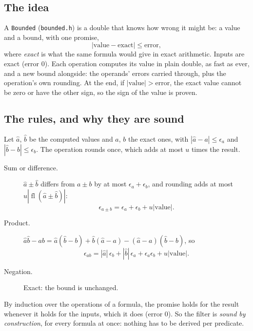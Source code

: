 \documentclass[11pt,a4paper]{article}
\newcommand{\code}[1]{\texttt{#1}}
\newcommand{\fl}{\operatorname{fl}}
\theoremstyle{definition}
\theoremstyle{remark}
\begin{document}
\subsection{The idea}

A \code{Bounded} (\code{bounded.h}) is a double that knows how wrong it might be: a value and a
bound, with one promise,
\[
  |\text{value} - \text{exact}| \le \text{error},
\]
where \emph{exact} is what the same formula would give in exact arithmetic. Inputs are exact
(error 0). Each operation computes its value in plain double, as fast as ever, and a new bound
alongside: the operands' errors carried through, plus the operation's own rounding. At the end, if
$|\text{value}| > \text{error}$, the exact value cannot be zero or have the other sign, so the sign
of the value is proven.

\subsection{The rules, and why they are sound}

Let $\hat a$, $\hat b$ be the computed values and $a$, $b$ the exact ones, with
$|\hat a - a| \le \epsilon_a$ and $|\hat b - b| \le \epsilon_b$. The operation rounds once, which
adds at most $u$ times the result.

\begin{description}
  \item[Sum or difference.] $\hat a \pm \hat b$ differs from $a \pm b$ by at most
    $\epsilon_a + \epsilon_b$, and rounding adds at most $u|\fl(\hat a \pm \hat b)|$:
    \[\epsilon_{a\pm b} = \epsilon_a + \epsilon_b + u|\text{value}|.\]
  \item[Product.] $\hat a\hat b - ab = \hat a(\hat b - b) + \hat b(\hat a - a) - (\hat a - a)(\hat b - b)$,
    so
    \[\epsilon_{ab} = |\hat a|\,\epsilon_b + |\hat b|\,\epsilon_a + \epsilon_a\epsilon_b + u|\text{value}|.\]
  \item[Negation.] Exact: the bound is unchanged.
\end{description}

By induction over the operations of a formula, the promise holds for the result whenever it holds
for the inputs, which it does (error 0). So the filter is \emph{sound by construction}, for every
formula at once: nothing has to be derived per predicate.
\end{document}
